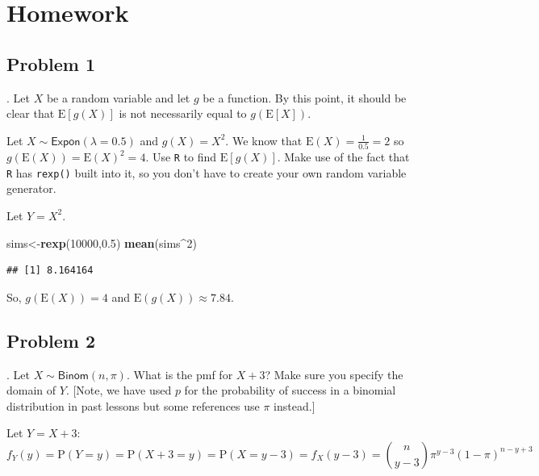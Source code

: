 \documentclass[
]{book}
\newenvironment{Shaded}{\begin{snugshade}}{\end{snugshade}}
\newcommand{\DecValTok}[1]{\textcolor[rgb]{0.00,0.00,0.81}{#1}}
\newcommand{\FloatTok}[1]{\textcolor[rgb]{0.00,0.00,0.81}{#1}}
\newcommand{\KeywordTok}[1]{\textcolor[rgb]{0.13,0.29,0.53}{\textbf{#1}}}
\newcommand{\NormalTok}[1]{#1}
\newcommand{\OperatorTok}[1]{\textcolor[rgb]{0.81,0.36,0.00}{\textbf{#1}}}
\begin{document}
\hypertarget{homework-15}{%
\section{Homework}\label{homework-15}}

\hypertarget{problem-1-15}{%
\subsection{Problem 1}\label{problem-1-15}}

. Let \(X\) be a random variable and let \(g\) be a function. By this point, it should be clear that \(\mbox{E}[g(X)]\) is not necessarily equal to \(g(\mbox{E}[X])\).

Let \(X\sim \textsf{Expon}(\lambda=0.5)\) and \(g(X)=X^2\). We know that \(\mbox{E}(X)=\frac{1}{0.5}=2\) so \(g(\mbox{E}(X))=\mbox{E}(X)^2=4\). Use \texttt{R} to find \(\mbox{E}[g(X)]\). Make use of the fact that \texttt{R} has \texttt{rexp()} built into it, so you don't have to create your own random variable generator.

Let \(Y=X^2\).

\begin{Shaded}
\begin{Highlighting}[]
\NormalTok{sims<-}\KeywordTok{rexp}\NormalTok{(}\DecValTok{10000}\NormalTok{,}\FloatTok{0.5}\NormalTok{)}
\KeywordTok{mean}\NormalTok{(sims}\OperatorTok{^}\DecValTok{2}\NormalTok{)}
\end{Highlighting}
\end{Shaded}

\begin{verbatim}
## [1] 8.164164
\end{verbatim}

So, \(g(\mbox{E}(X))=4\) and \(\mbox{E}(g(X))\approx 7.84\).

\hypertarget{problem-2-15}{%
\subsection{Problem 2}\label{problem-2-15}}

. Let \(X\sim \textsf{Binom}(n,\pi)\). What is the pmf for \(X+3\)? Make sure you specify the domain of \(Y\). {[}Note, we have used \(p\) for the probability of success in a binomial distribution in past lessons but some references use \(\pi\) instead.{]}

Let \(Y=X+3\):
\[
f_Y(y)=\mbox{P}(Y=y)=\mbox{P}(X+3=y)=\mbox{P}(X=y-3)=f_X(y-3)=\binom{n}{y-3}\pi^{y-3}(1-\pi)^{n-y+3}
\]
\end{document}
